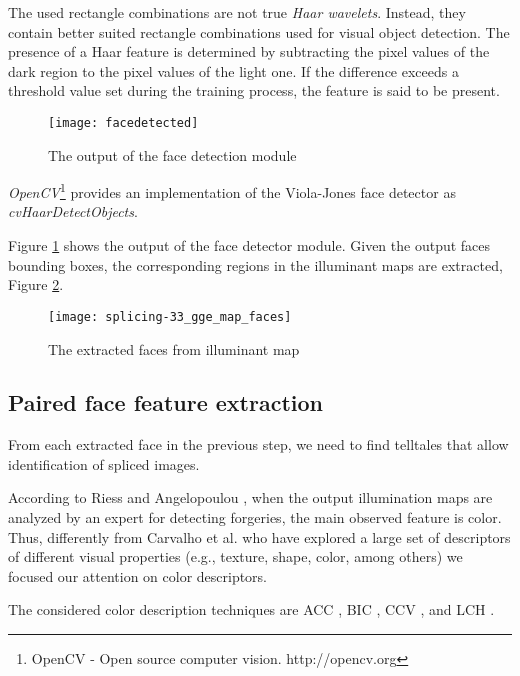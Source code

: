 The used rectangle combinations are not true \emph{Haar wavelets}\cite{haar1910theorie}. Instead, they contain better suited rectangle combinations used for visual object detection. The presence of a Haar feature is determined by subtracting the pixel values of the dark region to the pixel values of the light one. If the difference exceeds a threshold value set during the training process, the feature is said to be present. 

\begin{figure}[h!]
  \centering
    \texttt{[image: facedetected]}
    \caption{The output of the face detection module}
    \label{fig:facesdetected}
\end{figure}

\emph{OpenCV}\footnote{OpenCV - Open source computer vision. http://opencv.org} provides an implementation of the Viola-Jones face detector as \emph{cvHaarDetectObjects}.

Figure \ref{fig:facesdetected} shows the output of the face detector module. Given the output faces bounding boxes, the corresponding regions in the illuminant maps are extracted, Figure \ref{fig:facesdetectedmaps}.

\begin{figure}[h!]
  \centering
    \texttt{[image: splicing-33\_gge\_map\_faces]}
    \caption{The extracted faces from illuminant map}
    \label{fig:facesdetectedmaps}
\end{figure}

\subsection{Paired face feature extraction}

From each extracted face in the previous step, we need to find telltales that allow identification of spliced images. 

According to Riess and Angelopoulou \cite{riess2010scene}, when the output illumination maps are analyzed by an expert for detecting forgeries, the main observed feature is color. Thus, differently from Carvalho et al. \cite{carvalho2016illuminant} who have explored a large set of descriptors of different visual properties (e.g., texture, shape, color, among others) we focused our attention on color descriptors.

The considered color description techniques are ACC \cite{huang1997image}, BIC \cite{stehling2002compact}, CCV \cite{pass1997comparing}, and LCH \cite{swain1991color}.

